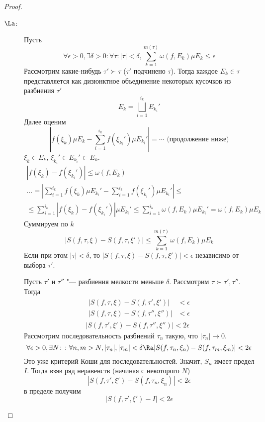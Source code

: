 \begin{proof}
\begin{description}
	\item[$\La$:]
		Пусть
		\[
			\forall \epsilon > 0, \exists \delta > 0\colon \forall \tau\colon |\tau| < \delta,
			\sum_{k=1}^{m(\tau)} \omega(f, E_k) \mu E_k \le \epsilon
		\]
		Рассмотрим какие-нибудь $\tau' \succ \tau$ ($\tau'$ подчинено $\tau$).
		Тогда каждое $E_k \in \tau$ представляется как дизюнктное объединение некоторых кусочков из разбиения $\tau'$
		\[ E_k = \bigsqcup_{i=1}^{i_k} E_{k_i}' \]
		Далее оценим
		\[
			\left| f(\xi_k) \mu E_k - \sum_{i=1}^{i_k} f\left(\xi_{k_i}'\right) \mu E_{k_i}' \right| = \cdots \text{~(продолжение ниже)}
		\]
		$\xi_k \in E_k$, $\xi_{k_i}' \in E_{k_i}' \subset E_k$.
		\begin{gather*}
			|f(\xi_k) - f\left(\xi_{k_i}'\right)| \le \omega(f, E_k) \\
			\dots = \left| \sum_{i=1}^{i_k} f(\xi_k) \mu E_{k_i}' - \sum_{i=1}^{i_k} f(\xi_{k_i}') \mu E_{k_i}' \right| \le \\
			\le \sum_{i=1}^{i_k} \left| f(\xi_k) - f\left(\xi_{k_i}'\right) \right| \mu E_{k_i}' \le \sum_{i=1}^{i_k}  \omega(f, E_k) \mu E_{k_i}' = \omega(f, E_k) \mu E_k
		\end{gather*}
		Суммируем по $k$
		\[
			|S(f, \tau, \xi) - S(f, \tau, \xi')| \le \sum_{k=1}^{m(\tau)} \omega(f, E_k) \mu E_k
		\]
		Если при этом $|\tau| < \delta$, то $|S(f, \tau, \xi) - S(f, \tau, \xi')| < \epsilon$ независимо от выбора $\tau'$.

		Пусть $\tau'$ и $\tau''$ "--- разбиения мелкости меньше $\delta$.
		Рассмотрим $\tau \succ \tau', \tau''$. Тогда
		\begin{gather*}
			\begin{aligned}
				|S(f, \tau, \xi) - S(f, \tau' , \xi' )| &< \epsilon \\
				|S(f, \tau, \xi) - S(f, \tau'', \xi'')| &< \epsilon
			\end{aligned} \\
			|S(f, \tau', \xi') - S(f, \tau'', \xi'')| < 2\epsilon
		\end{gather*}
		Рассмотрим последовательность разбиений $\tau_n$ такую, что $|\tau_n| \to 0$.
		\[ \forall \epsilon > 0, \exists N\colon \colon \forall n,m > N, |\tau_n|, |\tau_m| < \delta \Ra |S(f, \tau_n, \xi_n) - S(f, \tau_m, \xi_m)| < 2\epsilon \]
		Это уже критерий Коши для последовательностей.
		Значит, $S_n$ имеет предел $I$.
		Тогда взяв ряд неравенств (начиная с некоторого $N$)
		\[ | S(f, \tau', \xi') - S(f, \tau_n, \xi_n) | < 2\epsilon \]
		в пределе получим
		\[ | S(f, \tau', \xi') - I| < 2\epsilon \]
	\end{description}
\end{proof}

